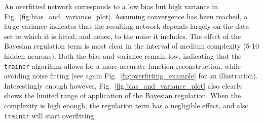 \documentclass[10pt,a4paper]{article}
\begin{document}
An overfitted network corresponds to a low bias but high variance in Fig.~\ref{fig:bias_and_variance_plot}. Assuming convergence has been reached, a large variance indicates that the resulting network depends largely on the data set to which it is fitted, and hence, to the noise it includes. The effect of the Bayesian regulation term is most clear in the interval of medium complexity (5-10 hidden neurons). Both the bias and variance remain low, indicating that the \texttt{trainbr} algorithm allows for a more accurate function reconstruction, while avoiding noise fitting (see again Fig.~\ref{fig:overfitting_example} for an illustration). Interestingly enough however, Fig.~\ref{fig:bias_and_variance_plot} also clearly shows the limited range of application of the Bayesian regulation. When the complexity is high enough, the regulation term has a negligible effect, and also \texttt{trainbr} will start overfitting.
\end{document}
